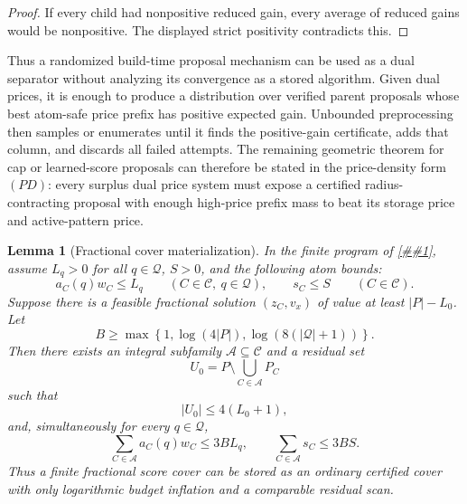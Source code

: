 \documentclass[10pt]{article}
\newcommand{\cref}[1]{\ref{##1}}
\newtheorem{lemma}[theorem]{Lemma}
\theoremstyle{definition}
\begin{document}
\begin{proof}
   If every child had nonpositive reduced gain, every average of reduced gains
   would be nonpositive.  The displayed strict positivity contradicts this.
\end{proof}

Thus a randomized build-time proposal mechanism can be used as a dual
separator without analyzing its convergence as a stored algorithm.  Given dual
prices, it is enough to produce a distribution over verified parent proposals
whose best atom-safe price prefix has positive expected gain.  Unbounded
preprocessing then samples or enumerates until it finds the positive-gain
certificate, adds that column, and discards all failed attempts.  The remaining
geometric theorem for cap or learned-score proposals can therefore be stated in
the price-density form \((PD)\): every surplus dual price system must expose a
certified radius-contracting proposal with enough high-price prefix mass to
beat its storage price and active-pattern price.

\begin{lemma}[Fractional cover materialization]\label{lem:fractional-cover-materialization}
   In the finite program of \cref{lem:finite-pool-dual}, assume $L_q>0$ for all
   $q\in\mathcal Q$, $S>0$, and the following atom bounds:
   \[
      a_C(q)w_C\le L_q \qquad(C\in\mathcal C,\ q\in\mathcal Q),
      \qquad
      s_C\le S \qquad(C\in\mathcal C).
   \]
   Suppose there is a feasible fractional solution $(z_C,v_x)$ of value at
   least $|P|-L_0$.  Let
   \[
      B\ge
      \max\left\{
         1,\log(4|P|),\log(8(|\mathcal Q|+1))
      \right\}.
   \]
   Then there exists an integral subfamily $\mathcal A\subseteq\mathcal C$ and a
   residual set
   \[
      U_0=P\setminus\bigcup_{C\in\mathcal A}P_C
   \]
   such that
   \[
      |U_0|\le 4(L_0+1),
   \]
   and, simultaneously for every $q\in\mathcal Q$,
   \[
      \sum_{C\in\mathcal A}a_C(q)w_C\le 3B L_q,
      \qquad
      \sum_{C\in\mathcal A}s_C\le 3B S .
   \]
   Thus a finite fractional score cover can be stored as an ordinary certified
   cover with only logarithmic budget inflation and a comparable residual scan.
\end{lemma}
\end{document}
